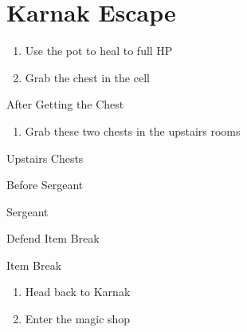 \chapter{Karnak Escape}

\vspace{\baselineskip}

\begin{paracol}{2}

\begin{enumerate}
    \item Use the pot to heal to full HP
    \item Grab the  chest in the cell
\end{enumerate}

\switchcolumn
\begin{steproute}{After Getting the Chest}
\end{steproute}

\switchcolumn*
\begin{enumerate}[resume]
    \item Grab these two  chests in the upstairs rooms
\end{enumerate}

\switchcolumn
\begin{misc}{Upstairs Chests}
\end{misc}

\switchcolumnTwice*
\begin{steproute}{Before Sergeant}
\end{steproute}

\switchcolumn
\begin{boss}{Sergeant}
    \varwb
    \begin{round}{1}
        \bartz Defend
        \faris Item \then {} \then Break
        \item {}
        \lenna Item \then \battleGroup{\iceRod} \then Break
    \end{round}
    \varwe
\end{boss}

\begin{enumerate}[resume]
    \item Head back to Karnak
    \item Enter the magic shop
\end{enumerate}


\end{paracol}
